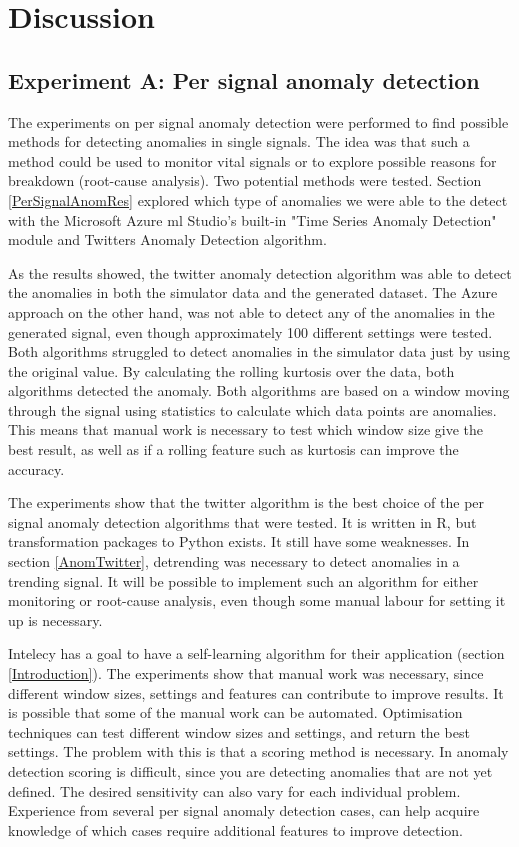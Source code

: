 \documentclass[english, a4paper]{report}
\begin{document}
\chapter{Discussion}
{
    \section{Experiment A: Per signal anomaly detection}
    { 
        The experiments on per signal anomaly detection were performed to find possible methods for detecting anomalies in single signals. The idea was that such a method could be used to monitor vital signals or to explore possible reasons for breakdown (root-cause analysis). Two potential methods were tested. Section \ref{PerSignalAnomRes} explored which type of anomalies we were able to the detect with the Microsoft Azure \gls{ml} Studio's built-in "Time Series Anomaly Detection" module and Twitters Anomaly Detection algorithm.
        \par 
        As the results showed, the twitter anomaly detection algorithm was able to detect the anomalies in both the simulator data and the generated dataset. The Azure approach on the other hand, was not able to detect any of the anomalies in the generated signal, even though approximately 100 different settings were tested. Both algorithms struggled to detect anomalies in the simulator data just by using the original value. By calculating the rolling kurtosis over the data, both algorithms detected the anomaly. Both algorithms are based on a window moving through the signal using statistics to calculate which data points are anomalies. This means that manual work is necessary to test which window size give the best result, as well as if a rolling feature such as kurtosis can improve the accuracy. 
        \par 
        The experiments show that the twitter algorithm is the best choice of the per signal anomaly detection algorithms that were tested. It is written in R, but transformation packages to Python exists. It still have some weaknesses. In section \ref{AnomTwitter}, detrending was necessary to detect anomalies in a trending signal. It will be possible to implement such an algorithm for either monitoring or root-cause analysis, even though some manual labour for setting it up is necessary.
        \par 
        Intelecy has a goal to have a self-learning algorithm for their application (section \ref{Introduction}). The experiments show that manual work was necessary, since different window sizes, settings and features can contribute to improve results. It is possible that some of the manual work can be automated. Optimisation techniques can test different window sizes and settings, and return the best settings. The problem with this is that a scoring method is necessary. In anomaly detection scoring is difficult, since you are detecting anomalies that are not yet defined. The desired sensitivity can also vary for each individual problem. Experience from several per signal anomaly detection cases, can help acquire knowledge of which cases require additional features to improve detection. 
    }
    
}
\end{document}
